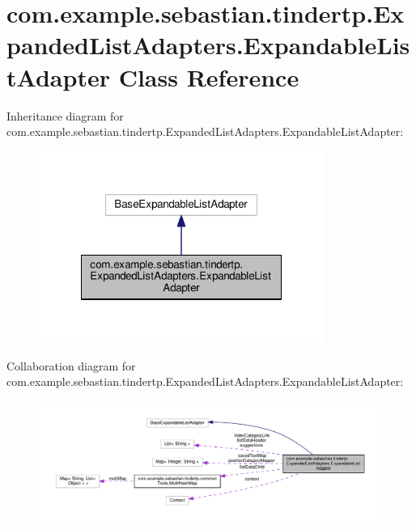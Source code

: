 \hypertarget{classcom_1_1example_1_1sebastian_1_1tindertp_1_1ExpandedListAdapters_1_1ExpandableListAdapter}{}\section{com.\+example.\+sebastian.\+tindertp.\+Expanded\+List\+Adapters.\+Expandable\+List\+Adapter Class Reference}
\label{classcom_1_1example_1_1sebastian_1_1tindertp_1_1ExpandedListAdapters_1_1ExpandableListAdapter}


Inheritance diagram for com.\+example.\+sebastian.\+tindertp.\+Expanded\+List\+Adapters.\+Expandable\+List\+Adapter\+:
\nopagebreak
\begin{figure}[H]
\begin{center}
\leavevmode
\includegraphics[width=264pt]{classcom_1_1example_1_1sebastian_1_1tindertp_1_1ExpandedListAdapters_1_1ExpandableListAdapter__inherit__graph}
\end{center}
\end{figure}


Collaboration diagram for com.\+example.\+sebastian.\+tindertp.\+Expanded\+List\+Adapters.\+Expandable\+List\+Adapter\+:
\nopagebreak
\begin{figure}[H]
\begin{center}
\leavevmode
\includegraphics[width=350pt]{classcom_1_1example_1_1sebastian_1_1tindertp_1_1ExpandedListAdapters_1_1ExpandableListAdapter__coll__graph}
\end{center}
\end{figure}
